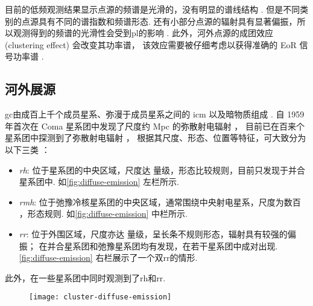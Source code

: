 目前的低频观测结果显示点源的频谱是光滑的，没有明显的谱线结构 \cite{offringa2016}.
但是不同类别的点源具有不同的谱指数和频谱形态.
还有小部分点源的辐射具有显著偏振，所以观测得到的频谱的光滑性会受到\ac{pl}的影响
\cite{geil2011,vanEck2018}.
此外，河外点源的成团效应 (clustering effect) 会改变其功率谱，
该效应需要被仔细考虑以获得准确的 EoR 信号功率谱
\cite{diMatteo2002,diMatteo2004,liu2011,alonso2015,murray2017}.

\subsection{河外展源}
\label{sec:eg-extended}

\ac{gc}由成百上千个成员星系、弥漫于成员星系之间的 \ac{icm} 以及暗物质组成
\cite{sarazin1986,bohringer2010}.
自 1959 年首次在 Coma 星系团中发现了尺度约 \si{Mpc} 的弥散射电辐射 \cite{large1959}，
目前已在百来个星系团中探测到了弥散射电辐射 \cite{feretti2012,vanWeeren2019}，
根据其尺度、形态、位置等特征，可大致分为以下三类
\cite{feretti2012,kale2016}：
\begin{itemize}
  \item \emph{\acf{rh}}:
    位于星系团的中央区域，尺度达 \si{\Mpc} 量级，形态比较规则，目前只发现于并合星系团中.
    如\autoref{fig:diffuse-emission} 左栏所示.
  \item \emph{\acf{rmh}}:
    位于弛豫冷核星系团的中央区域，通常围绕中央射电星系，尺度为数百 \si{\kpc}，形态规则.
    如\autoref{fig:diffuse-emission} 中栏所示.
  \item \emph{\acf{rr}}:
    位于外围区域，尺度亦达 \si{\Mpc} 量级，呈长条不规则形态，辐射具有较强的偏振；
    在并合星系团和弛豫星系团均有发现，在若干星系团中成对出现.
    \autoref{fig:diffuse-emission} 右栏展示了一个双\ac{rr}的情形.
\end{itemize}
此外，在一些星系团中同时观测到了\ac{rh}和\ac{rr}.

\begin{figure}[htp]
  \centering
  \texttt{[image: cluster-diffuse-emission]}
  \label{fig:diffuse-emission}
\end{figure}

